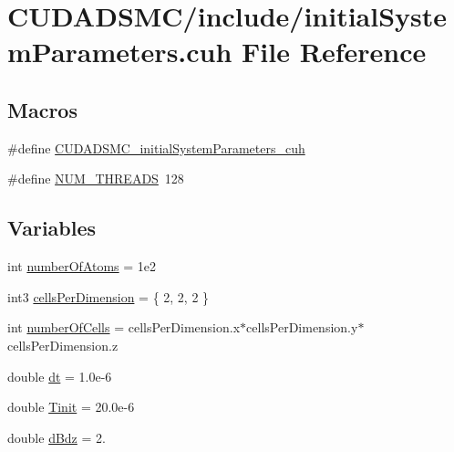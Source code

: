 \hypertarget{initial_system_parameters_8cuh}{\section{C\+U\+D\+A\+D\+S\+M\+C/include/initial\+System\+Parameters.cuh File Reference}
\label{initial_system_parameters_8cuh}
}
\subsection*{Macros}
\begin{DoxyCompactItemize}
\item 
\#define \hyperlink{initial_system_parameters_8cuh_a6207d3bb17783a8b3a78c71fd84aab7b}{C\+U\+D\+A\+D\+S\+M\+C\+\_\+initial\+System\+Parameters\+\_\+cuh}
\item 
\#define \hyperlink{initial_system_parameters_8cuh_a7735206bdfad487588bba2126b806ab7}{N\+U\+M\+\_\+\+T\+H\+R\+E\+A\+D\+S}~128
\end{DoxyCompactItemize}
\subsection*{Variables}
\begin{DoxyCompactItemize}
\item 
int \hyperlink{initial_system_parameters_8cuh_a5ce690e43012981ef3034cbf0c746489}{number\+Of\+Atoms} = 1e2
\item 
int3 \hyperlink{initial_system_parameters_8cuh_af9f9488dcc4649cd47838407efec5dbe}{cells\+Per\+Dimension} = \{ 2, 2, 2 \}
\item 
int \hyperlink{initial_system_parameters_8cuh_ae88ac292f19dd72c295602c5dbb17bd6}{number\+Of\+Cells} = cells\+Per\+Dimension.\+x$\ast$cells\+Per\+Dimension.\+y$\ast$cells\+Per\+Dimension.\+z
\item 
double \hyperlink{initial_system_parameters_8cuh_a03e28be41881b703c836edbfe9b51b17}{dt} = 1.\+0e-\/6
\item 
double \hyperlink{initial_system_parameters_8cuh_a321f450cd54ae9c0d795e718297adbf9}{Tinit} = 20.\+0e-\/6
\item 
double \hyperlink{initial_system_parameters_8cuh_a25fc2a358206c74d3dfd41c48d05bb9d}{d\+Bdz} = 2.
\end{DoxyCompactItemize}


